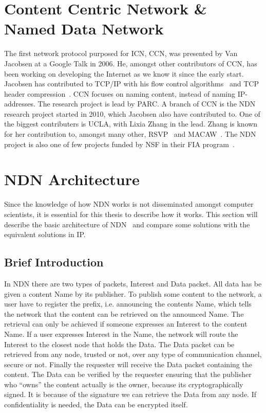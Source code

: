 \section{Content Centric Network \& Named Data Network}\label{chp2:sec:icn}
The first network protocol purposed for \gls{ICN}, \gls{CCN}, was presented by Van Jacobsen at a Google Talk in 2006. 
He, amongst other contributors of \gls{CCN}, has been working on developing the Internet as we know it since the early start.
Jacobsen has contributed to \gls{TCP}/\gls{IP} with his flow control algorithms~\cite{DBLP:conf/sigcomm/Jacobson88} and \gls{TCP} header compression~\cite{rfc1144}.
\gls{CCN} focuses on naming content, instead of naming \gls{IP}-addresses. 
The research project is lead by \gls{PARC}.
A branch of \gls{CCN} is the \gls{NDN}~\cite{DBLP:journals/ccr/0001ABJcCPWZ14} research project started in 2010, which Jacobsen also have contributed to.
One of the biggest contributers is \gls{UCLA}, with Lixia Zhang  in the lead. 
Zhang is known for her contribution to, amongst many other, \gls{RSVP}~\cite{rfc2205} and \gls{MACAW}~\cite{DBLP:conf/sigcomm/BharghavanDSZ94}.
The \gls{NDN} project is also one of few projects funded by \gls{NSF} in their \gls{FIA} program~\cite{nsf-fia}.

\section{NDN Architecture}\label{chp2:sec:ndn_architecture}
Since the knowledge of how \gls{NDN} works is not disseminated amongst computer scientists, it is essential for this thesis to describe how it works.
This section will describe the basic architecture of \gls{NDN}~\cite{NDN-0021} and compare some solutions with the equivalent solutions in \gls{IP}.

\subsection{Brief Introduction}
In \gls{NDN} there are two types of packets, Interest and Data packet.
All data has be given a content Name by its publisher. 
To publish some content to the network, a user have to register the prefix, i.e. announcing the contents Name, which tells the network that the content can be retrieved on the announced Name. 
The retrieval can only be achieved if someone expresses an Interest to the content Name.
If a user expresses Interest in the Name, the network will route the Interest to the closest node that holds the Data. 
The Data packet can be retrieved from any node, trusted or not, over any type of communication channel, secure or not. 
Finally the requester will receive the Data packet containing the content.
The Data can be verified by the requester ensuring that the publisher who ``owns'' the content actually is the owner, because its cryptographically signed.
It is because of the signature we can retrieve the Data from any node.
If confidentiality is needed, the Data can be encrypted itself. 

